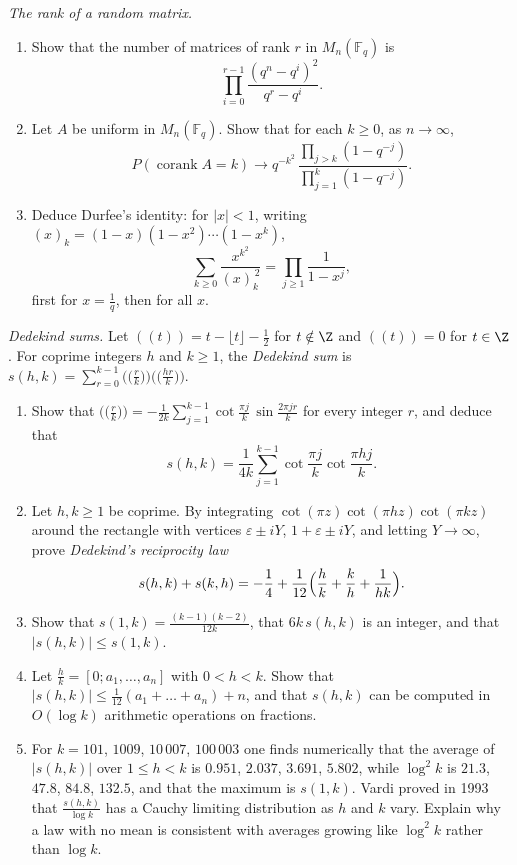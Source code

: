\begin{exercise}[$\star\star$]\label{pb:rankdist}
\emph{The rank of a random matrix.}
\begin{enumerate}[label=(\alph*)]
\item Show that the number of matrices of rank $r$ in $M_n(\mathbb F_q)$ is
\[
\prod_{i=0}^{r-1}\frac{(q^n-q^i)^2}{q^r-q^i}.
\]
\item Let $A$ be uniform in $M_n(\mathbb F_q)$. Show that for each $k\ge0$, as $n\to\infty$,
\[
P(\operatorname{corank}A=k)\longrightarrow q^{-k^2}\,\frac{\prod_{j>k}(1-q^{-j})}{\prod_{j=1}^k(1-q^{-j})}.
\]
\item Deduce Durfee's identity: for $|x|<1$, writing $(x)_k=(1-x)(1-x^2)\cdots(1-x^k)$,
\[
\sum_{k\ge0}\frac{x^{k^2}}{(x)_k^{\,2}}=\prod_{j\ge1}\frac1{1-x^j},
\]
first for $x=\frac1q$, then for all $x$.
\end{enumerate}
\end{exercise}

\begin{exercise}[Journey]\label{pb:dedekind}
\emph{Dedekind sums.} Let $((t))=t-\lfloor t\rfloor-\frac12$ for $t\notin\Z$ and $((t))=0$ for $t\in\Z$. For coprime integers $h$ and $k\ge1$, the \emph{Dedekind sum} is
$s(h,k)=\sum_{r=0}^{k-1}\bigl(\bigl(\frac rk\bigr)\bigr)\bigl(\bigl(\frac{hr}k\bigr)\bigr)$.
\begin{enumerate}[label=(\alph*)]
\item Show that $\bigl(\bigl(\frac rk\bigr)\bigr)=-\frac1{2k}\sum_{j=1}^{k-1}\cot\frac{\pi j}k\,\sin\frac{2\pi jr}k$ for every integer $r$, and deduce that
\[
s(h,k)=\frac1{4k}\sum_{j=1}^{k-1}\cot\frac{\pi j}k\cot\frac{\pi hj}k.
\]
\item Let $h,k\ge1$ be coprime. By integrating $\cot(\pi z)\cot(\pi hz)\cot(\pi kz)$ around the rectangle with vertices $\varepsilon\pm iY$, $1+\varepsilon\pm iY$, and letting
$Y\to\infty$, prove \emph{Dedekind's reciprocity law}
\[
s(h,k)+s(k,h)=-\frac14+\frac1{12}\Bigl(\frac hk+\frac kh+\frac1{hk}\Bigr).
\]
\item Show that $s(1,k)=\frac{(k-1)(k-2)}{12k}$, that $6k\,s(h,k)$ is an integer, and that $|s(h,k)|\le s(1,k)$.
\item Let $\frac hk=[0;a_1,\dots,a_n]$ with $0<h<k$. Show that $|s(h,k)|\le\frac1{12}(a_1+\dots+a_n)+n$, and that $s(h,k)$ can be computed in $O(\log k)$ arithmetic
operations on fractions.
\item For $k=101$, $1009$, $10\,007$, $100\,003$ one finds numerically that the average of $|s(h,k)|$ over $1\le h<k$ is $0.951$, $2.037$, $3.691$, $5.802$, while $\log^2k$ is
$21.3$, $47.8$, $84.8$, $132.5$, and that the maximum is $s(1,k)$. Vardi proved in 1993 that $\frac{s(h,k)}{\log k}$ has a Cauchy limiting distribution as $h$ and $k$
vary. Explain why a law with no mean is consistent with averages growing like $\log^2k$ rather than $\log k$.
\end{enumerate}
\end{exercise}

